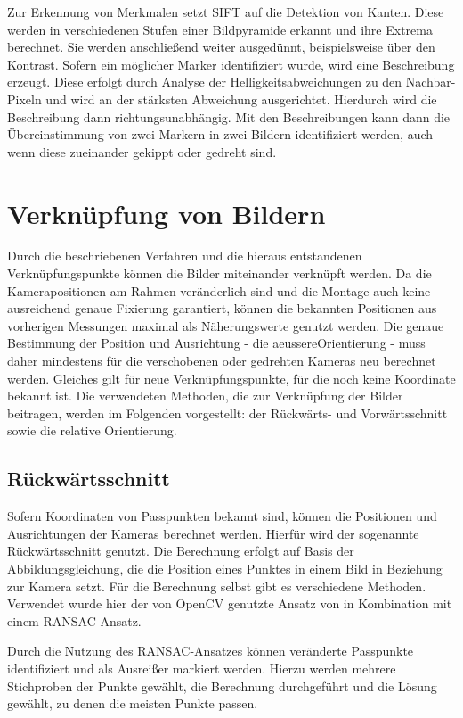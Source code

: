 \documentclass[./00PhotoBox.tex]{subfiles}
\begin{document}
Zur Erkennung von Merkmalen setzt \gls{SIFT} auf die Detektion von Kanten. Diese werden in verschiedenen Stufen einer Bildpyramide erkannt und ihre Extrema berechnet. Sie werden anschließend weiter ausgedünnt, beispielsweise über den Kontrast. Sofern ein möglicher Marker identifiziert wurde, wird eine Beschreibung erzeugt. Diese erfolgt  durch Analyse der Helligkeitsabweichungen zu den Nachbar-Pixeln und wird an der stärksten Abweichung ausgerichtet. Hierdurch wird die Beschreibung dann richtungsunabhängig. Mit den Beschreibungen kann dann die Übereinstimmung von zwei Markern in zwei Bildern identifiziert werden, auch wenn diese zueinander gekippt oder gedreht sind.
\citep[vgl.][S. 484f]{luhmann}

\section{Verknüpfung von Bildern}
\label{s:photogramm}
Durch die beschriebenen Verfahren und die hieraus entstandenen Verknüpfungs\-punkte können die Bilder miteinander verknüpft werden. Da die Kamerapositionen am Rahmen veränderlich sind und die Montage auch keine ausreichend genaue Fixierung garantiert, können die bekannten Positionen aus vorherigen Messungen maximal als Näherungswerte genutzt werden. Die genaue Bestimmung der Position und Ausrichtung - die \gls{aeussereOrientierung} - muss daher mindestens für die verschobenen oder gedrehten Kameras neu berechnet werden. Gleiches gilt für neue Verknüpfungspunkte, für die noch keine Koordinate bekannt ist. Die verwendeten Methoden, die zur Verknüpfung der Bilder beitragen, werden im Folgenden vorgestellt: der Rückwärts- und Vorwärtsschnitt sowie die relative Orientierung.

\subsection{Rückwärtsschnitt}
Sofern Koordinaten von Passpunkten bekannt sind, können die Positionen und Ausrichtungen der Kameras berechnet werden. Hierfür wird der sogenannte Rückwärtsschnitt genutzt. Die Berechnung erfolgt auf Basis der Abbildungsgleichung, die die Position eines Punktes in einem Bild in Beziehung zur Kamera setzt. Für die Berechnung selbst gibt es verschiedene Methoden. Verwendet wurde hier der von OpenCV genutzte Ansatz von \citet{Lepetit2008} in Kombination mit einem RANSAC-Ansatz.

Durch die Nutzung des RANSAC-Ansatzes können veränderte Passpunkte identifiziert und als Ausreißer markiert werden. Hierzu werden mehrere Stichproben der Punkte gewählt, die Berechnung durchgeführt und die Lösung gewählt, zu denen die meisten Punkte passen. \citep[vgl.][S. 134]{luhmann}
\end{document}
